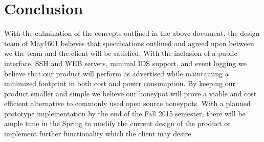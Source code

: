 \chapter{Conclusion}

With the culmination of the concepts outlined in the above document, the design team of May1601 believes that specifications outlined and agreed upon between we the team and the client will be satisfied. With the inclusion of a public interface, SSH and WEB servers, minimal IDS support, and event logging we believe that our product will perform as advertised while maintaining a minimized footprint in both cost and power consumption. By keeping our product smaller and simple we believe our honeypot will prove a viable and cost efficient alternative to commonly used open source honeypots. With a planned prototype implementation by the end of the Fall 2015 semester, there will be ample time in the Spring to modify the current design of the product or implement further functionality which the client may desire. 
